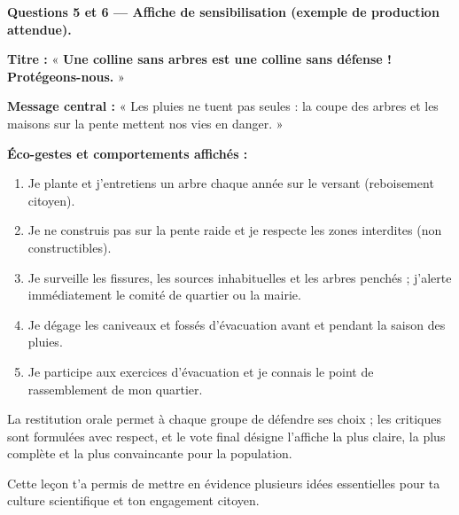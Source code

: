 \documentclass[11pt]{article}
\newcounter{popsec}
\newcounter{popsub}
\newcommand{\courssub}[1]{%
  \stepcounter{popsub}%
  \par\vspace{9pt}\noindent{\popxbold\fontsize{11.5}{13}\selectfont\color{popink}{\color{poporange}\thepopsec.\thepopsub}\hspace{6pt}#1}\par\nopagebreak\vspace{4pt}
}
\begin{document}
\begin{exoresolu}
\textbf{Questions 5 et 6 — Affiche de sensibilisation (exemple de production attendue).}\par
\textbf{Titre :} « \textbf{Une colline sans arbres est une colline sans défense ! Protégeons-nous.} »\par
\textbf{Message central :} « Les pluies ne tuent pas seules : la coupe des arbres et les maisons sur la pente mettent nos vies en danger. »\par
\textbf{Éco-gestes et comportements affichés :}
\begin{enumerate}
\item Je plante et j'entretiens un arbre chaque année sur le versant (reboisement citoyen).
\item Je ne construis pas sur la pente raide et je respecte les zones interdites (non constructibles).
\item Je surveille les fissures, les sources inhabituelles et les arbres penchés ; j'alerte immédiatement le comité de quartier ou la mairie.
\item Je dégage les caniveaux et fossés d'évacuation avant et pendant la saison des pluies.
\item Je participe aux exercices d'évacuation et je connais le point de rassemblement de mon quartier.
\end{enumerate}
La restitution orale permet à chaque groupe de défendre ses choix ; les critiques sont formulées avec respect, et le vote final désigne l'affiche la plus claire, la plus complète et la plus convaincante pour la population.
\end{exoresolu}

\courssub{Bilan de la leçon}

Cette leçon t'a permis de mettre en évidence plusieurs idées essentielles pour ta culture scientifique et ton engagement citoyen.
\end{document}
